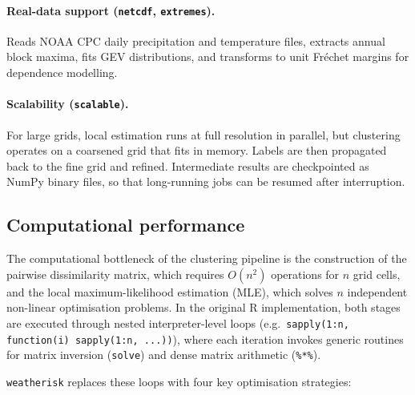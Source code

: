 \documentclass[preprint,12pt,a4paper]{elsarticle}
\begin{document}
\paragraph{Real-data support (\texttt{netcdf}, \texttt{extremes}).}
Reads NOAA CPC daily precipitation and temperature files,
extracts annual block maxima, fits GEV distributions, and
transforms to unit Fr\'{e}chet margins for dependence modelling.

\paragraph{Scalability (\texttt{scalable}).}
For large grids, local estimation runs at full resolution in
parallel, but clustering operates on a coarsened grid that fits
in memory.  Labels are then propagated back to the fine grid
and refined.  Intermediate results are checkpointed as NumPy
binary files, so that long-running jobs can be resumed after
interruption.

\subsection{Computational performance}
\label{sec:performance}

The computational bottleneck of the clustering pipeline is the
construction of the pairwise dissimilarity matrix, which requires
$O(n^2)$ operations for $n$ grid cells, and the local
maximum-likelihood estimation (MLE), which solves $n$ independent
non-linear optimisation problems.  In the original R implementation,
both stages are executed through nested interpreter-level loops
(e.g.\ \texttt{sapply(1:n, function(i) sapply(1:n, ...))}), where
each iteration invokes generic routines for matrix inversion
(\texttt{solve}) and dense matrix arithmetic (\texttt{\%*\%}).

\texttt{weatherisk} replaces these loops with four key
optimisation strategies:
\end{document}
